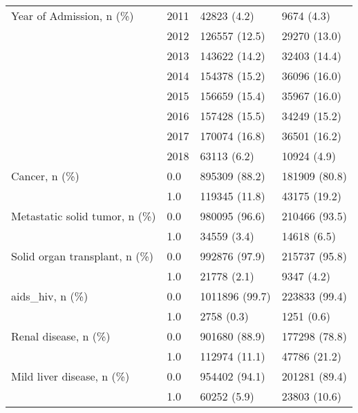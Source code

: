 \begin{tabular}{llll}
Year of Admission, n (\%) & 2011 &                    42823 (4.2) &        9674 (4.3) \\
                                       & 2012 &                  126557 (12.5) &      29270 (13.0) \\
                                       & 2013 &                  143622 (14.2) &      32403 (14.4) \\
                                       & 2014 &                  154378 (15.2) &      36096 (16.0) \\
                                       & 2015 &                  156659 (15.4) &      35967 (16.0) \\
                                       & 2016 &                  157428 (15.5) &      34249 (15.2) \\
                                       & 2017 &                  170074 (16.8) &      36501 (16.2) \\
                                       & 2018 &                    63113 (6.2) &       10924 (4.9) \\
Cancer, n (\%) & 0.0 &                  895309 (88.2) &     181909 (80.8) \\
                                       & 1.0 &                  119345 (11.8) &      43175 (19.2) \\
Metastatic solid tumor, n (\%) & 0.0 &                  980095 (96.6) &     210466 (93.5) \\
                                       & 1.0 &                    34559 (3.4) &       14618 (6.5) \\
Solid organ transplant, n (\%) & 0.0 &                  992876 (97.9) &     215737 (95.8) \\
                                       & 1.0 &                    21778 (2.1) &        9347 (4.2) \\
aids\_hiv, n (\%) & 0.0 &                 1011896 (99.7) &     223833 (99.4) \\
                                       & 1.0 &                     2758 (0.3) &        1251 (0.6) \\
Renal disease, n (\%) & 0.0 &                  901680 (88.9) &     177298 (78.8) \\
                                       & 1.0 &                  112974 (11.1) &      47786 (21.2) \\
Mild liver disease, n (\%) & 0.0 &                  954402 (94.1) &     201281 (89.4) \\
                                       & 1.0 &                    60252 (5.9) &      23803 (10.6) \\

\end{tabular}
